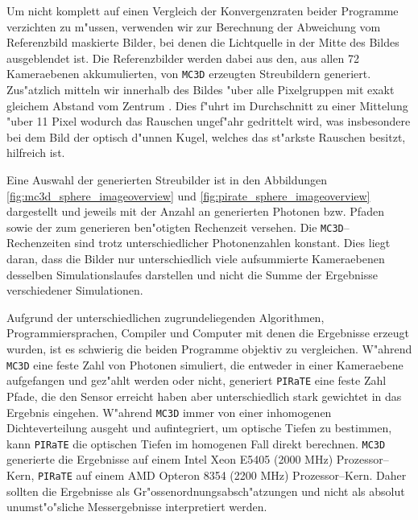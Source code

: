 	Um nicht komplett auf einen Vergleich der Konvergenzraten beider Programme verzichten zu m"ussen, verwenden wir zur Berechnung der Abweichung vom Referenzbild maskierte Bilder, bei denen die Lichtquelle in der Mitte des Bildes ausgeblendet ist.	 Die Referenzbilder %
	werden dabei aus den, aus allen 72 Kameraebenen akkumulierten, von \texttt{MC3D} erzeugten Streubildern generiert. Zus"atzlich mitteln wir innerhalb des Bildes "uber alle Pixelgruppen mit exakt gleichem Abstand vom Zentrum%
	. Dies f"uhrt im Durchschnitt zu einer Mittelung "uber 11 Pixel wodurch das Rauschen ungef"ahr gedrittelt wird, was insbesondere bei dem Bild der optisch d"unnen Kugel, welches das st"arkste Rauschen besitzt, hilfreich ist.
	
		
	
	Eine Auswahl der generierten Streubilder ist in den Abbildungen \ref{fig:mc3d_sphere_imageoverview} und \ref{fig:pirate_sphere_imageoverview} dargestellt und jeweils mit der Anzahl an generierten Photonen bzw. Pfaden sowie der zum generieren ben"otigten Rechenzeit versehen. Die \texttt{MC3D}--Rechenzeiten sind trotz unterschiedlicher Photonenzahlen konstant. Dies liegt daran, dass die Bilder nur unterschiedlich viele aufsummierte Kameraebenen desselben Simulationslaufes darstellen und nicht die Summe der Ergebnisse verschiedener Simulationen.
	
	Aufgrund der unterschiedlichen zugrundeliegenden Algorithmen, Programmiersprachen, Compiler und Computer mit denen die Ergebnisse erzeugt wurden, ist es schwierig die beiden Programme objektiv zu vergleichen. W"ahrend \texttt{MC3D} eine feste Zahl von Photonen simuliert, die entweder in einer Kameraebene aufgefangen und gez"ahlt werden oder nicht, generiert \texttt{PIRaTE} eine feste Zahl Pfade, die den Sensor erreicht haben aber unterschiedlich stark gewichtet in das Ergebnis eingehen. W"ahrend \texttt{MC3D} immer von einer inhomogenen Dichteverteilung ausgeht und aufintegriert, um optische Tiefen zu bestimmen, kann \texttt{PIRaTE} die optischen Tiefen im homogenen Fall direkt berechnen. \texttt{MC3D} generierte die Ergebnisse auf einem Intel Xeon E5405 (2000 MHz) Prozessor--Kern, \texttt{PIRaTE} auf einem AMD Opteron 8354 (2200 MHz) Prozessor--Kern. Daher sollten die Ergebnisse als Gr"ossenordnungsabsch"atzungen und nicht als absolut unumst"o"sliche Messergebnisse interpretiert werden.
	
